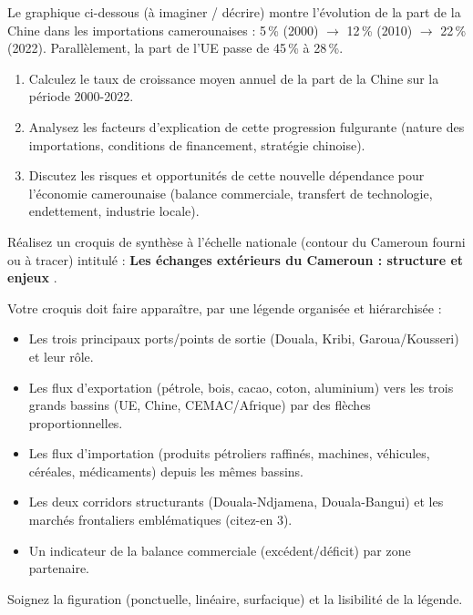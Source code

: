 \documentclass[11pt]{article}
\begin{document}
\begin{exercice}
\label{exo:chine}
Le graphique ci-dessous (à imaginer / décrire) montre l'évolution de la part de la Chine dans les importations camerounaises : 5\,\% (2000) $\to$ 12\,\% (2010) $\to$ 22\,\% (2022). Parallèlement, la part de l'UE passe de 45\,\% à 28\,\%.

\begin{enumerate}
    \item Calculez le taux de croissance moyen annuel de la part de la Chine sur la période 2000-2022.
    \item Analysez les facteurs d'explication de cette progression fulgurante (nature des importations, conditions de financement, stratégie chinoise).
    \item Discutez les risques et opportunités de cette nouvelle dépendance pour l'économie camerounaise (balance commerciale, transfert de technologie, endettement, industrie locale).
\end{enumerate}
\end{exercice}

\begin{exercice}
\label{exo:croquis}
Réalisez un croquis de synthèse à l'échelle nationale (contour du Cameroun fourni ou à tracer) intitulé : \og \textbf{Les échanges extérieurs du Cameroun : structure et enjeux} \fg.

Votre croquis doit faire apparaître, par une légende organisée et hiérarchisée :
\begin{itemize}
    \item Les trois principaux ports/points de sortie (Douala, Kribi, Garoua/Kousseri) et leur rôle.
    \item Les flux d'exportation (pétrole, bois, cacao, coton, aluminium) vers les trois grands bassins (UE, Chine, CEMAC/Afrique) par des flèches proportionnelles.
    \item Les flux d'importation (produits pétroliers raffinés, machines, véhicules, céréales, médicaments) depuis les mêmes bassins.
    \item Les deux corridors structurants (Douala-Ndjamena, Douala-Bangui) et les marchés frontaliers emblématiques (citez-en 3).
    \item Un indicateur de la balance commerciale (excédent/déficit) par zone partenaire.
\end{itemize}
Soignez la figuration (ponctuelle, linéaire, surfacique) et la lisibilité de la légende.
\end{exercice}
\end{document}
